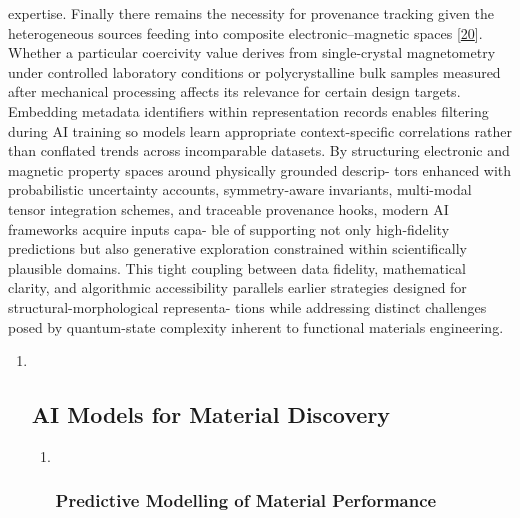 \documentclass[
]{article}
\begin{document}
expertise. Finally there remains the necessity for provenance tracking
given the heterogeneous sources feeding into composite
electronic--magnetic spaces {[}\protect\hyperlink{_bookmark60}{20}{]}.
Whether a particular coercivity value derives from single-crystal
magnetometry under controlled laboratory conditions or polycrystalline
bulk samples measured after mechanical processing affects its relevance
for certain design targets. Embedding metadata identifiers within
representation records enables filtering during AI training so models
learn appropriate context-specific correlations rather than conflated
trends across incomparable datasets. By structuring electronic and
magnetic property spaces around physically grounded descrip- tors
enhanced with probabilistic uncertainty accounts, symmetry-aware
invariants, multi-modal tensor integration schemes, and traceable
provenance hooks, modern AI frameworks acquire inputs capa- ble of
supporting not only high-fidelity predictions but also generative
exploration constrained within scientifically plausible domains. This
tight coupling between data fidelity, mathematical clarity, and
algorithmic accessibility parallels earlier strategies designed for
structural-morphological representa- tions while addressing distinct
challenges posed by quantum-state complexity inherent to functional
materials engineering.

\begin{enumerate}
\def\labelenumi{\arabic{enumi}.}
\setcounter{enumi}{1}
\item ~
  \hypertarget{ai-models-for-material-discovery}{%
  \subsection{AI Models for Material
  Discovery}\label{ai-models-for-material-discovery}}

  \begin{enumerate}
  \def\labelenumii{\arabic{enumii}.}
  \item ~
    \hypertarget{predictive-modelling-of-material-performance}{%
    \subsubsection{Predictive Modelling of Material
    Performance}\label{predictive-modelling-of-material-performance}}
  \end{enumerate}
\end{enumerate}
\end{document}
